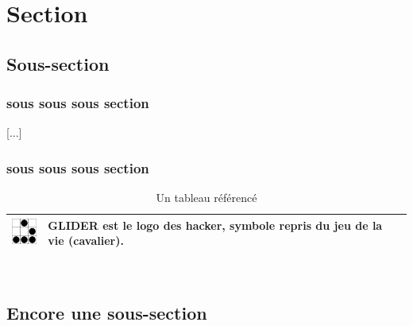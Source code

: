 \documentclass[11pt,twoside,a4paper]{article}
\begin{document}
\section{Section}



\subsection{Sous-section}



\subsubsection{sous sous sous section}

[...]~\\

\subsubsection{sous sous sous section}


\begin{table}[ht]

	\begin{center}

		\begin{tabular}{|p{}|p{}|}

		\hline

			\includegraphics[width=1cm]{img/logo_glider.png}
			& 
			\textbf{GLIDER} est le logo des hacker, symbole repris du jeu de la vie (cavalier). \\

		\hline

		\end{tabular}

	\end{center}

	\caption{Un tableau r{\'e}f{\'e}renc{\'e}}

	\label{tab:TabReference01}

\end{table}~\\



\clearpage

\subsection{Encore une sous-section}
\end{document}
